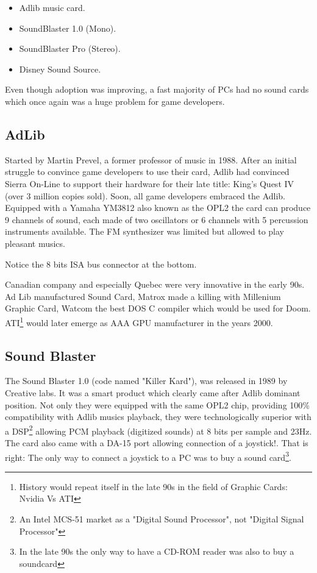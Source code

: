 \documentclass[book.tex]{subfiles}
\begin{document}
\par
\begin{itemize}
\item Adlib music card.
\item SoundBlaster 1.0 (Mono).
\item SoundBlaster Pro (Stereo).
\item Disney Sound Source.
\end{itemize}
\par
Even though adoption was improving, a fast majority of PCs had no sound cards which once again was a huge problem for game developers.


  \subsection{AdLib}
  Started by Martin Prevel, a former professor of music in 1988. After an initial struggle to convince game developers to use their card, Adlib had convinced Sierra On-Line to support their hardware for their late title: King's Quest IV (over 3 million copies sold). Soon, all game developers embraced the Adlib. Equipped with a Yamaha YM3812 also known as the OPL2 the card can produce 9 channels of sound, each made of two oscillators or 6 channels with 5 percussion instruments available. The FM synthesizer was limited but allowed to play pleasant musics.\\
  \begin{figure}[H] 
    \centering 
  \end{figure}
    Notice the 8 bits ISA bus connector at the bottom.
\par
{} Canadian company and especially Quebec were very innovative in the early 90s. Ad Lib manufactured Sound Card, Matrox made a killing with Millenium Graphic Card, Watcom the best DOS C compiler which would be used for Doom. ATI\footnote{History would repeat itself in the late 90s in the field of Graphic Cards: Nvidia Vs ATI} would later emerge as AAA GPU manufacturer in the years 2000.\\
  
  


  \subsection{Sound Blaster}
  The Sound Blaster 1.0 (code named "Killer Kard"), was released in 1989 by Creative labs. It was a smart product which clearly came after Adlib dominant position. Not only they were equipped with the same OPL2 chip, providing 100\% compatibility with Adlib musics playback, they were technologically superior with a DSP\footnote{An Intel MCS-51 market as a "Digital Sound Processor", not "Digital Signal Processor"}  allowing PCM playback (digitized sounds) at 8 bits per sample and 23Hz. The card also came with a DA-15 port allowing connection of a joystick!. That is right: The only way to connect a joystick to a PC was to buy a sound card\footnote{In the late 90s the only way to have a CD-ROM reader was also to buy a soundcard}.\\ 
\par
\end{document}
